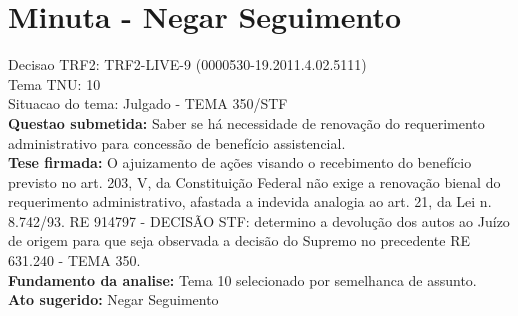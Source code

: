 \documentclass{article}
\begin{document}
\section*{Minuta - Negar Seguimento}
Decisao TRF2: TRF2-LIVE-9 (0000530-19.2011.4.02.5111)\\
Tema TNU: 10\\
Situacao do tema: Julgado - TEMA 350/STF\\
\textbf{Questao submetida:} Saber se há necessidade de renovação do requerimento administrativo para concessão de benefício assistencial.\\
\textbf{Tese firmada:} O ajuizamento de ações visando o recebimento do benefício previsto no art. 203, V, da Constituição Federal não exige a renovação bienal do requerimento administrativo, afastada a indevida analogia ao art. 21, da Lei n. 8.742/93. RE 914797 - DECISÃO STF: determino a devolução dos autos ao Juízo de origem para que seja observada a decisão do Supremo no precedente RE 631.240 - TEMA 350.\\
\textbf{Fundamento da analise:} Tema 10 selecionado por semelhanca de assunto.\\
\textbf{Ato sugerido:} Negar Seguimento
\end{document}
